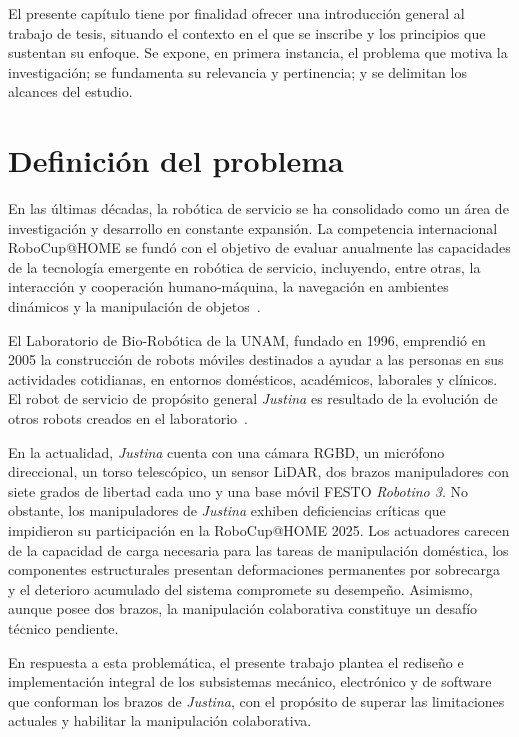El presente capítulo tiene por finalidad ofrecer una introducción general al trabajo de tesis, situando el contexto en el que se inscribe y los principios que sustentan su enfoque. Se expone, en primera instancia, el problema que motiva la investigación; se fundamenta su relevancia y pertinencia; y se delimitan los alcances del estudio.

\section{Definición del problema}

En las últimas décadas, la robótica de servicio se ha consolidado como un área de investigación y desarrollo en constante expansión. La competencia internacional RoboCup@HOME se fundó con el objetivo de evaluar anualmente las capacidades de la tecnología emergente en robótica de servicio, incluyendo, entre otras, la interacción y cooperación humano-máquina, la navegación en ambientes dinámicos y la manipulación de objetos~\cite{robocup_athome}. 

El Laboratorio de Bio-Robótica de la UNAM, fundado en 1996, emprendió en 2005 la construcción de robots móviles destinados a ayudar a las personas en sus actividades cotidianas, en entornos domésticos, académicos, laborales y clínicos. El robot de servicio de propósito general \emph{Justina} es resultado de la evolución de otros robots creados en el laboratorio~\cite{justina_uv}.

En la actualidad, \emph{Justina} cuenta con una cámara RGBD, un micrófono direccional, un torso telescópico, un sensor LiDAR, dos brazos manipuladores con siete grados de libertad cada uno y una base móvil FESTO \emph{Robotino 3}. No obstante, los manipuladores de \emph{Justina} exhiben deficiencias críticas que impidieron su participación en la RoboCup@HOME 2025. Los actuadores carecen de la capacidad de carga necesaria para las tareas de manipulación doméstica, los componentes estructurales presentan deformaciones permanentes por sobrecarga y el deterioro acumulado del sistema compromete su desempeño. Asimismo, aunque posee dos brazos, la manipulación colaborativa constituye un desafío técnico pendiente.

En respuesta a esta problemática, el presente trabajo plantea el rediseño e implementación integral de los subsistemas mecánico, electrónico y de software que conforman los brazos de \emph{Justina}, con el propósito de superar las limitaciones actuales y habilitar la manipulación colaborativa.

